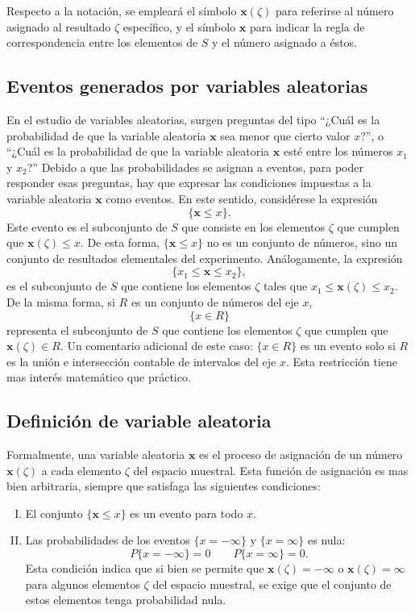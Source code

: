 \documentclass[a4paper]{report}
\newcommand{\x}{\mathbf{x}}
\begin{document}
Respecto a la notación, se empleará el símbolo \(\x(\zeta)\) para referirse al número asignado al resultado \(\zeta\) específico, y el símbolo \(\x\) para indicar la regla de correspondencia entre los elementos de \(S\) y el número asignado a éstos.

\subsection{Eventos generados por variables aleatorias}

En el estudio de variables aleatorias, surgen preguntas del tipo ``¿Cuál es la probabilidad de que la variable aleatoria \(\x\) sea menor que cierto valor \(x\)?'', o ``¿Cuál es la probabilidad de que la variable aleatoria \(\x\) esté entre los números \(x_1\) y \(x_2\)?'' Debido a que las probabilidades se asignan a eventos, para poder responder esas preguntas, hay que expresar las condiciones impuestas a la variable aleatoria \(\x\) como eventos. En este sentido, considérese la expresión
\[
 \{\x\leq x\}.
\]
Este evento es el subconjunto de \(S\) que consiste en los elementos \(\zeta\) que cumplen que \(\x(\zeta)\leq x\). De esta forma, \(\{\x\leq x\}\) no es un conjunto de números, sino un conjunto de resultados elementales del experimento. Análogamente, la expresión
\[
 \{x_1\leq\x\leq x_2\},
\]
es el subconjunto de \(S\) que contiene los elementos \(\zeta\) tales que \(x_1\leq\x(\zeta)\leq x_2\). De la misma forma, si \(R\) es un conjunto de números del eje \(x\),
\[
 \{x\in R\}
\]
representa el subconjunto de \(S\) que contiene los elementos \(\zeta\) que cumplen que \(\x(\zeta)\in R\). Un comentario adicional de este caso: \(\{x\in R\}\) es un evento solo si \(R\) es la unión e intersección contable de intervalos del eje \(x\). Esta restricción tiene mas interés matemático que práctico.

\subsection{Definición de variable aleatoria}

Formalmente, una variable aleatoria \(\x\) es el proceso de asignación de un número \(\x(\zeta)\) a cada elemento \(\zeta\) del espacio muestral. Esta función de asignación es mas bien arbitraria, siempre que satisfaga las siguientes condiciones:
\begin{enumerate}[I.]
 \item El conjunto \(\{\x\leq x\}\) es un evento para todo \(x\).
 \item Las probabilidades de los eventos \(\{x=-\infty\}\) y \(\{x=\infty\}\) es nula:
 \[
  P\{x=-\infty\}=0\qquad P\{x=\infty\}=0.
 \]
 Esta condición indica que si bien se permite que \(\x(\zeta)=-\infty\) o \(\x(\zeta)=\infty\) para algunos elementos \(\zeta\) del espacio muestral, se exige que el conjunto de estos elementos tenga probabilidad nula.
\end{enumerate}
\end{document}
